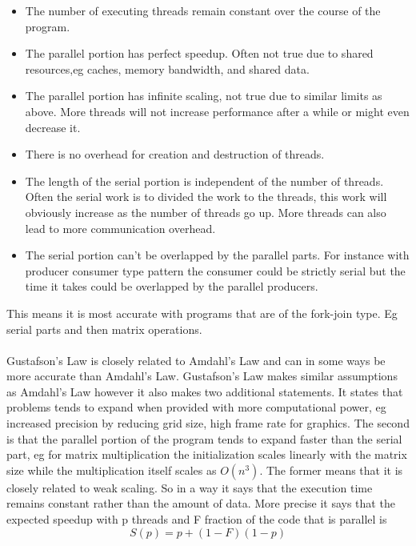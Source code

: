 \documentclass[10pt,a4paper]{article}
\begin{document}
\begin{itemize}
  \item The number of executing threads remain constant over the course of the program.
  \item The parallel portion has perfect speedup. Often not true due to shared resources,eg caches, memory bandwidth, and shared data.
  \item The parallel portion has infinite scaling, not true due to similar limits as above. More threads will not increase performance after a while or might even decrease it.
  \item There is no overhead for creation and destruction of threads.
  \item The length of the serial portion is independent of the number of threads. Often the serial work is to divided the work to the threads, this work will obviously increase as the number of threads go up. More threads can also lead to more communication overhead.
  \item The serial portion can't be overlapped by the parallel parts. For instance with producer consumer type pattern the consumer could be strictly serial but the time it takes could be overlapped by the parallel producers.
\end{itemize}

This means it is most accurate with programs that are of the fork-join type. Eg serial parts and then matrix operations.\\
\\
Gustafson's Law is closely related to Amdahl's Law and can in some ways be more accurate than Amdahl's Law. Gustafson's Law makes similar assumptions as Amdahl's Law however it also makes two additional statements. It states that problems tends to expand when provided with more computational power, eg increased precision by reducing grid size, high frame rate for graphics. The second is that the parallel portion of the program tends to expand faster than the serial part, eg for matrix multiplication the initialization scales linearly with the matrix size while the multiplication itself scales as $O(n^3)$. The former means that it is closely related to weak scaling. So in a way it says that the execution time remains constant rather than the amount of data. More precise it says that the expected speedup with p threads and F fraction of the code that is parallel is\cite{gustafson1988reevaluating, cuda_best_practice}
$$S(p)=p+(1-F)(1-p)$$
\end{document}
